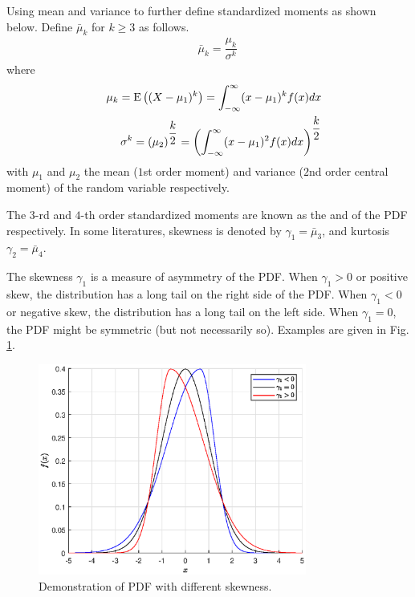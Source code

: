 Using mean and variance to further define standardized moments as shown below. Define $\bar{\mu}_k$ for $k\geq 3$ as follows.
\begin{eqnarray}
	&& \bar{\mu}_k = \dfrac{\mu_k}{\sigma^k} \nonumber
\end{eqnarray}
where
\begin{eqnarray}
	&& \mu_k = \textup{E}\left((X-\mu_1)^k\right) = \int_{-\infty}^{\infty}(x-\mu_1)^kf(x)dx \nonumber \\
	&& \sigma^k = \left(\mu_2\right)^{\dfrac{k}{2}} = \left(\int_{-\infty}^{\infty}(x-\mu_1)^2f(x)dx\right)^{\dfrac{k}{2}} \nonumber
\end{eqnarray}
with $\mu_1$ and $\mu_2$ the mean ($1$st order moment) and variance ($2$nd order central moment) of the random variable respectively.

The $3$-rd and $4$-th order standardized moments are known as the  and  of the PDF respectively. In some literatures, skewness is denoted by $\gamma_1 = \bar{\mu}_3$, and kurtosis $\gamma_2 = \bar{\mu}_4$.

The skewness $\gamma_1$ is a measure of asymmetry of the PDF. When $\gamma_1 > 0$ or positive skew, the distribution has a long tail on the right side of the PDF. When $\gamma_1 <0$ or negative skew, the distribution has a long tail on the left side. When $\gamma_1 = 0$, the PDF might be symmetric (but not necessarily so). Examples are given in Fig. \ref{fig:skewness_demo}.
\begin{figure}[!htb]
	\centering
	\includegraphics[width=250pt]{chapters/part-1/figures/skewness_demo.eps}
	\caption{Demonstration of PDF with different skewness.} \label{fig:skewness_demo}
\end{figure}

